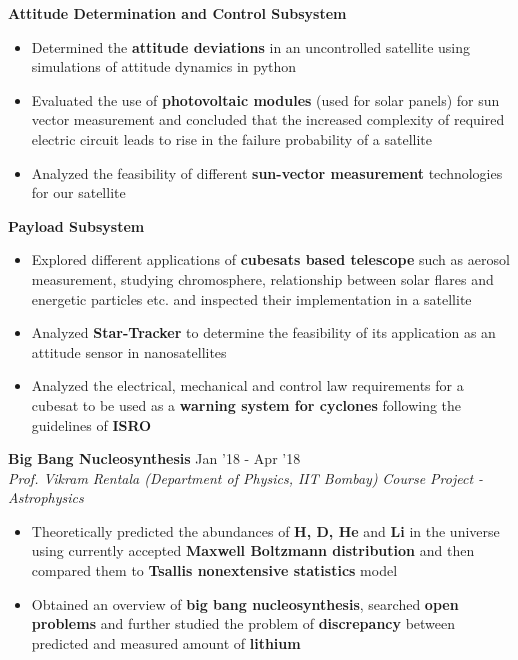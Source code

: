 \documentclass[8pt]{article}%
\begin{document}
{{\flushleft \bf {Attitude Determination and Control Subsystem}} 
   
   \begin{itemize}
   \setlength\itemsep{0.01em}
	\vspace{-2mm}
    \item Determined the {\bf attitude deviations} in an uncontrolled satellite using simulations of attitude dynamics in python
    \item Evaluated the use of {\bf photovoltaic modules} (used for solar panels) for sun vector measurement and concluded that the increased complexity of required electric circuit leads to rise in the failure probability of a satellite
    \item Analyzed the feasibility of different {\bf sun-vector measurement} technologies for our satellite
 \end{itemize}
    {\flushleft \bf {Payload Subsystem}} 
   
   \begin{itemize}
   \setlength\itemsep{0.01em}
	\vspace{-2mm}
	\item Explored different applications of {\bf cubesats based telescope} such as aerosol measurement, studying chromosphere, relationship between solar flares and energetic particles etc. and inspected their implementation in a satellite
    \item Analyzed {\bf Star-Tracker} to determine the feasibility of its application as an attitude sensor in \nohyphens{nanosatellites}
    \item Analyzed the electrical, mechanical and control law requirements for a cubesat to be used as a {\bf warning system for cyclones} following the guidelines of {\bf ISRO}

    \end{itemize}

{\flushleft \bf \large{Big Bang Nucleosynthesis}} \hfill {{{Jan '18 - Apr '18} }} \\
{\em Prof. Vikram Rentala (Department of Physics, IIT Bombay)} \hfill{\em Course Project - Astrophysics}
\begin{itemize}
\setlength\itemsep{0.01em}
 \item Theoretically predicted the abundances of {\bf H, D, He} and {\bf Li} in the universe using currently accepted {\bf Maxwell Boltzmann distribution} and then compared them to {\bf Tsallis nonextensive statistics} model
 \item Obtained an overview of {\bf big bang nucleosynthesis}, searched {\bf open problems} and further studied the problem of {\bf discrepancy} between predicted and measured amount of {\bf lithium}
\end{itemize}

}
\end{document}
